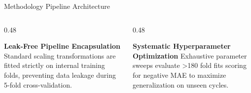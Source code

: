 \documentclass[aspectratio=169, 10pt]{beamer}
\begin{document}
\begin{frame}{Methodology Pipeline Architecture}
\begin{center}
{%
}
\end{center}
\vspace{-0.4em}
\begin{columns}[T]
  \begin{column}{0.48\textwidth}
    \begin{block}{\textbf{Leak-Free Pipeline Encapsulation}}
      \scriptsize Standard scaling transformations are fitted strictly on internal training folds, preventing data leakage during 5-fold cross-validation.
    \end{block}
  \end{column}
  \begin{column}{0.48\textwidth}
    \begin{block}{\textbf{Systematic Hyperparameter Optimization}}
      \scriptsize Exhaustive parameter sweeps evaluate >180 fold fits scoring for negative MAE to maximize generalization on unseen cycles.
    \end{block}
  \end{column}
\end{columns}
\end{frame}
\end{document}
